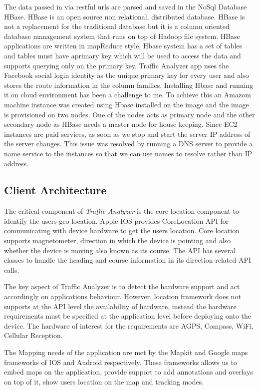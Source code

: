 \documentclass[10pt]{sigplan-proc-varsize}
\begin{document}
The data passed in via restful urls are parsed and saved in the NoSql Database HBase.  HBase is an open source non relational, distributed database. HBase is not a replacement for the traditional database but it is a column oriented database management system that runs on top of Hadoop file system. HBase applications are written in mapReduce style. Hbase system has a set of tables and tables must have aprimary key which will be used to access the data and supports querying only on the primary key.  Traffic Analyzer app uses the Facebook social login identity as the unique primary key for every user and also stores the route information in the column families. Installing Hbase and running it on cloud environment has been a challenge to me. To achieve this an Amazom machine instance was created using Hbase installed on the image and the image is provisioned on two nodes. One of the nodes acts as primary node and the other secondary node as HBase needs a master node for house keeping. Since EC2 instances are paid services, as soon as we stop and start the server IP address of the server changes. This issue was resolved by running a DNS server to provide a name service to the instances so that we can use names to resolve rather than IP address. 

\subsection{Client Architecture}

The critical component of \textit{Traffic Analyzer} is the core location component to identify the users geo location. Apple IOS provides CoreLocation API for communicating with device hardware to get the users location. Core location supports magnetometer, direction in which the device is pointing and also whether the device is moving also known as its course. The API has several classes to handle the heading and course information in its direction-related API calls.

The key aspect of Traffic Analyzer is to detect the hardware support and act accordingly on applications behaviour. However, location framework does not supports at the API level the availability of hardware, instead the hardware requirements must be specified at the application level before deploying onto the device. The hardware of interest for the requirements are AGPS, Compass, WiFi, Cellular Reception.

The Mapping needs of the application are met by the Mapkit and Google maps frameworks of IOS and Android respectively. These frameworks allows us to embed maps on the application, provide support to add annotations and overlays on top of it, show users location on the map and tracking modes.
\end{document}
